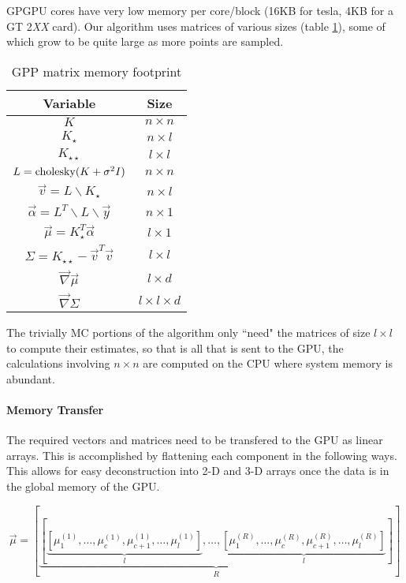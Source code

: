 GPGPU cores have very low memory per core/block (16KB for tesla, 4KB for a GT 2{\it XX} card). Our algorithm uses matrices of various sizes (table \ref{EPImemory}), some of which grow to be quite large as more points are sampled.

\begin{table}
    \caption{GPP matrix memory footprint}
    \label{EPImemory}
\begin{center}
    \begin{tabular}{c|c}
    Variable & Size \\
    \hline
    $K$ & $n \times n$ \\
    $K_{\star }$ & $n \times l$ \\
    $K_{\star \star }$ & $l \times l$ \\
    $L = {\rm cholesky}(K + \sigma^{2}I) $ & $n \times n$ \\
    $\vec{v} = L \backslash K_{\star }$ & $n \times l$ \\
    $\vec{\alpha} = L^{T} \backslash L \backslash \vec{y}$ & $n \times 1$ \\
    $\vec{\mu} = K_{\star }^{T}\vec{\alpha}$ & $l \times 1$  \\
    $\Sigma = K_{\star \star} - \vec{v}^{T}\vec{v}$ & $l \times l$ \\
    $\vec{\nabla} \vec{\mu}$ & $l \times d$ \\
    $\vec{\nabla} \Sigma$ & $l \times l \times d$
    \end{tabular}
\end{center}
\end{table}

The trivially MC portions of the algorithm only ``need" the matrices of size $l \times l$ to compute their estimates, so that is all that is sent to the GPU, the calculations involving $n \times n$ are computed on the CPU where system memory is abundant.

\paragraph{Memory Transfer} %
\label{ssub:Memory Transfer}

The required vectors and matrices need to be transfered to the GPU as linear arrays. This is accomplished by flattening each component in the following ways. This allows for easy deconstruction into 2-D and 3-D arrays once the data is in the global memory of the GPU.

\begin{equation}
    \vec{\mu} = \left[ \underbrace{\left[ \underbrace{\left[\mu_{1}^{(1)}, \ldots, \mu_{c}^{(1)}, \mu_{c+1}^{(1)}, \ldots, \mu_{l}^{(1)} \right]}_{l}, \ldots, \underbrace{\left[\mu_{1}^{(R)}, \ldots, \mu_{c}^{(R)}, \mu_{c+1}^{(R)}, \ldots, \mu_{l}^{(R)} \right]}_{l} \right]}_{R} \right]
\end{equation}

